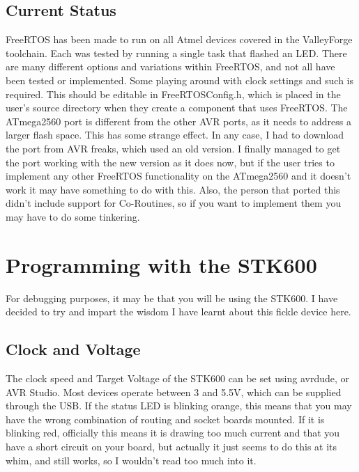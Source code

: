 \documentclass[a4paper, oneside, 11pt, titlepage, onecolumn, openright]{report}
\begin{document}
{			
\section{Current Status}
			\label{s:FreeRTOSCurrentStatus}
			FreeRTOS has been made to run on all Atmel devices covered in the ValleyForge toolchain. Each was tested by running a single task that flashed an LED. There are many different options and variations within FreeRTOS, and not all have been tested or implemented. \newline
			Some playing around with clock settings and such is required. This should be editable in FreeRTOSConfig.h, which is placed in the user's source directory when they create a component that uses FreeRTOS.\newline
			The ATmega2560 port is different from the other AVR ports, as it needs to address a larger flash space. This has some strange effect. In any case, I had to download the port from AVR freaks, which used an old version. I finally managed to get the port working with the new version as it does now, but if the user tries to implement any other FreeRTOS functionality on the ATmega2560 and it doesn't work it may have something to do with this. Also, the person that ported this didn't include support for Co-Routines, so if you want to implement them you may have to do some tinkering.
			
			
\chapter{Programming with the STK600}
			\label{C:STK600}
			For debugging purposes, it may be that you will be using the STK600. I have decided to try and impart the wisdom I have learnt about this fickle device here.
			
\section{Clock and Voltage}
			\label{STK600ClockVoltage}
			The clock speed and Target Voltage of the STK600 can be set using avrdude, or AVR Studio. Most devices operate between 3 and 5.5V, which can be supplied through the USB.\newline
			If the status LED is blinking orange, this means that you may have the wrong combination of routing and socket boards mounted. If it is blinking red, officially this means it is drawing too much current and that you have a short circuit on your board, but actually it just seems to do this at its whim, and still works, so I wouldn't read too much into it.			
			
}
\end{document}

